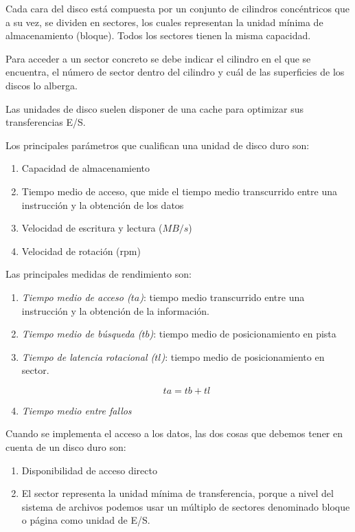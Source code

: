 \documentclass[10pt,a4paper,spanish]{report}
\begin{document}
Cada cara del disco está compuesta por un conjunto de cilindros concéntricos que a su vez, se dividen en sectores, los cuales representan la unidad mínima de almacenamiento (bloque). Todos los sectores tienen la misma capacidad. 

Para acceder a un sector concreto se debe indicar el cilindro en el que se encuentra, el número de sector dentro del cilindro y cuál de las superficies de los discos lo alberga.

Las unidades de disco suelen disponer de una cache para optimizar sus transferencias E/S.

Los principales parámetros que cualifican una unidad de disco duro son:
\begin{enumerate}[$\heartsuit$]
    \item Capacidad de almacenamiento
    \item Tiempo medio de acceso, que mide el tiempo medio transcurrido entre una instrucción y la obtención de los datos
    \item Velocidad de escritura y lectura ($MB/s$)
    \item Velocidad de rotación (rpm)
\end{enumerate}

Las principales medidas de rendimiento son:
\begin{enumerate}[$\heartsuit$]
    \item \textit{\textcolor[rgb]{1,0.2,0.3}{Tiempo medio de acceso ($ta$)}}: tiempo medio transcurrido entre una instrucción y la obtención de la información.
    \item \textit{\textcolor[rgb]{1,0.2,0.3}{Tiempo medio de búsqueda ($tb$)}}: tiempo medio de posicionamiento en pista
    \item \textit{\textcolor[rgb]{1,0.2,0.3}{Tiempo de latencia rotacional ($tl$)}}: tiempo medio de posicionamiento en sector.

    \begin{displaymath}
    ta = tb + tl
    \end{displaymath}

    \item \textit{\textcolor[rgb]{1,0.2,0.3}{Tiempo medio entre fallos}}
\end{enumerate}

Cuando se implementa el acceso a los datos, las dos cosas que debemos tener en cuenta de un disco duro son:
\begin{enumerate}[$\heartsuit$]
    \item Disponibilidad de acceso directo
    \item El sector representa la unidad mínima de transferencia, porque a nivel del sistema de archivos podemos usar un múltiplo de sectores denominado bloque o página como unidad de E/S.
\end{enumerate}
\end{document}
